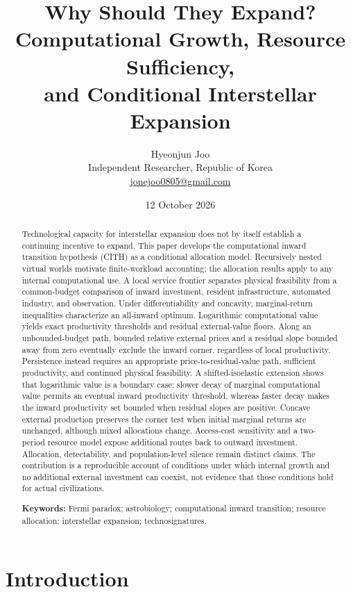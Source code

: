 \documentclass[11pt,a4paper]{article}
\title{Why Should They Expand?\\[3pt]\large Computational Growth, Resource Sufficiency,\\and Conditional Interstellar Expansion}
\author{Hyeonjun Joo\\[3pt]\normalsize Independent Researcher, Republic of Korea\\\normalsize\href{mailto:jonejoo0805@gmail.com}{jonejoo0805@gmail.com}}
\date{12 October 2026}
\theoremstyle{definition}\newtheorem{definition}{Definition}
\begin{document}
\maketitle
\begin{abstract}
Technological capacity for interstellar expansion does not by itself establish a continuing incentive to expand. This paper develops the computational inward transition hypothesis (CITH) as a conditional allocation model. Recursively nested virtual worlds motivate finite-workload accounting; the allocation results apply to any internal computational use. A local service frontier separates physical feasibility from a common-budget comparison of inward investment, resident infrastructure, automated industry, and observation. Under differentiability and concavity, marginal-return inequalities characterize an all-inward optimum. Logarithmic computational value yields exact productivity thresholds and residual external-value floors. Along an unbounded-budget path, bounded relative external prices and a residual slope bounded away from zero eventually exclude the inward corner, regardless of local productivity. Persistence instead requires an appropriate price-to-residual-value path, sufficient productivity, and continued physical feasibility. A shifted-isoelastic extension shows that logarithmic value is a boundary case: slower decay of marginal computational value permits an eventual inward productivity threshold, whereas faster decay makes the inward productivity set bounded when residual slopes are positive. Concave external production preserves the corner test when initial marginal returns are unchanged, although mixed allocations change. Access-cost sensitivity and a two-period resource model expose additional routes back to outward investment. Allocation, detectability, and population-level silence remain distinct claims. The contribution is a reproducible account of conditions under which internal growth and no additional external investment can coexist, not evidence that those conditions hold for actual civilizations.
\par\smallskip\noindent\textbf{Keywords:} Fermi paradox; astrobiology; computational inward transition; resource allocation; interstellar expansion; technosignatures.

\end{abstract}
\ifdefined\reviewmode\linenumbers\fi

\section{Introduction}
\end{document}
